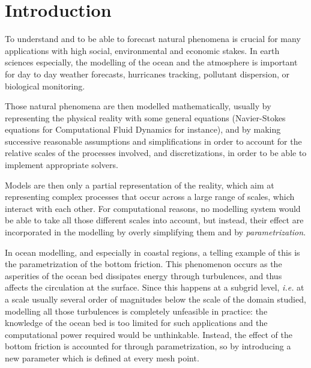 \documentclass[../../Main_ManuscritThese.tex]{subfiles}
\begin{document}
\pagestyle{introStyle}
\chapter*{Introduction}
\TitleBtwLines
{}
{}
\label{chap:Introduction}
To understand and to be able to forecast natural phenomena is crucial
for many applications with high social, environmental and economic
stakes.  In earth sciences especially, the modelling of the ocean and
the atmosphere is important for day to day weather forecasts,
hurricanes tracking, pollutant dispersion, or biological monitoring.

Those natural phenomena are then modelled mathematically, usually by
representing the physical reality with some general equations
(Navier-Stokes equations for Computational Fluid Dynamics for
instance), and by making successive reasonable assumptions and
simplifications in order to account for the relative scales of the
processes involved, and discretizations, in order to be able to
implement appropriate solvers.

Models are then only a partial representation of the reality, which
aim at representing complex processes that occur across a large range
of scales, which interact with each other. For computational reasons,
no modelling system would be able to take all those different scales
into account, but instead, their effect are incorporated in the
modelling by overly simplifying them and by \emph{parametrization}.

In ocean modelling, and especially in coastal regions, a telling
example of this is the parametrization of the bottom friction. This
phenomenon occurs as the asperities of the ocean bed dissipates energy
through turbulences, and thus affects the circulation at the
surface. Since this happens at a subgrid level, \emph{i.e.} at a scale
usually several order of magnitudes below the scale of the domain
studied, modelling all those turbulences is completely unfeasible in
practice: the knowledge of the ocean bed is too limited for such
applications and the computational power required would be
unthinkable. Instead, the effect of the bottom friction is accounted
for through parametrization, so by introducing a new parameter which
is defined at every mesh point.
\end{document}
